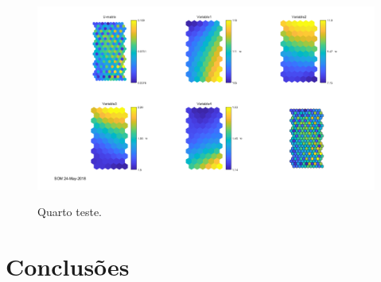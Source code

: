 \documentclass[journal, a4paper]{IEEEtran}
\begin{document}
\begin{figure}
	\centering
	\includegraphics[scale=0.5]{Images/SOM4.png}
	\label{SOM4}
	\caption{Quarto teste.}
\end{figure}

\section{Conclusões}










\end{document}
